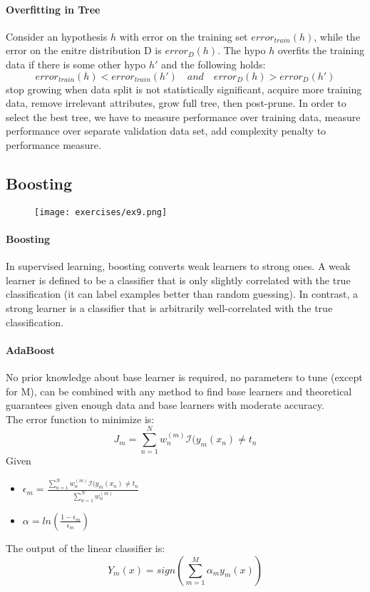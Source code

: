 \paragraph{Overfitting in Tree}
Consider an hypothesis $h$ with error on the training set $error_{train}(h)$, while the error on the enitre distribution D is $error_D(h)$. The hypo $h$ overfits the training data if there is some other hypo $h'$ and the following holds:
\[error_{train}(h)<error_{train}(h')\quad and \quad error_D(h)>error_D(h')\]
stop growing when data split is not statistically significant, acquire more training data, remove irrelevant attributes, grow full tree, then post-prune. In order to select the best tree, we have to measure performance over training data, measure performance over separate validation data set, add complexity penalty to performance measure.

\subsection{Boosting}
\begin{figure}[H]
    \centering
    \texttt{[image: exercises/ex9.png]}
\end{figure}

\paragraph{Boosting}
In supervised learning, boosting converts weak learners to strong ones. A weak learner is defined to be a classifier that is only slightly correlated with the true classification (it can label examples better than random guessing). In contrast, a strong learner is a classifier that is arbitrarily well-correlated with the true classification.

\paragraph{AdaBoost}
No prior knowledge about base learner is required, no parameters to tune (except for M), can be combined with any method to find base learners and theoretical guarantees given enough data and base learners with moderate accuracy.\\
The error function to minimize is:
\[J_m=\sum_{n=1}^N w_n^{(m)}\mathcal{I}(y_m(x_n)\neq t_n\]
Given 
\begin{itemize}
\item $\epsilon_m = \frac{\sum_{n=1}^N w_n^{(m)}\mathcal{I}(y_m(x_n)\neq t_n}{\sum_{n=1}^N w_n^{(m)}}$
\item $\alpha=ln(\frac{1-\epsilon_m}{\epsilon_m})$
\end{itemize}
The output of the linear classifier is:
\[Y_m(x)=sign(\sum_{m=1}^M\alpha_my_m(x))\]


